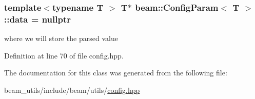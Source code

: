\subsubsection[{\texorpdfstring{data}{data}}]{\setlength{\rightskip}{0pt plus 5cm}template$<$typename T $>$ T$\ast$ {\bf beam\+::\+Config\+Param}$<$ T $>$\+::data = nullptr\hspace{0.3cm}{\ttfamily [protected]}}\hypertarget{classbeam_1_1_config_param_a1f5a1becff7e710e61bbc0dac8289ce8}{}\label{classbeam_1_1_config_param_a1f5a1becff7e710e61bbc0dac8289ce8}


where we will store the parsed value 



Definition at line 70 of file config.\+hpp.



The documentation for this class was generated from the following file\+:\begin{DoxyCompactItemize}
\item 
beam\+\_\+utils/include/beam/utils/\hyperlink{config_8hpp}{config.\+hpp}\end{DoxyCompactItemize}
